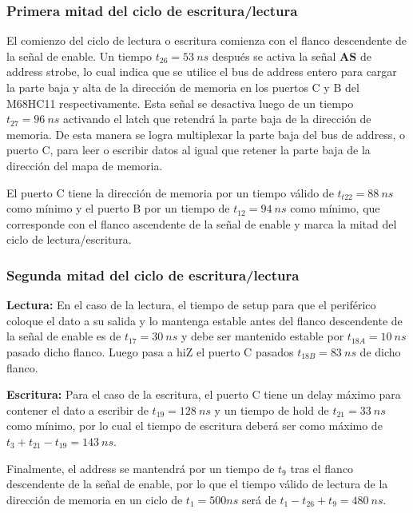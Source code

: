 \subsubsection{Primera mitad del ciclo de escritura/lectura}

El comienzo del ciclo de lectura o escritura comienza con el flanco descendente de la señal de enable. Un tiempo $t_{26} = 53 \ ns$ después se activa la señal \textbf{AS} de address strobe, lo cual indica que se utilice el bus de address entero para cargar la parte baja y alta de la dirección de memoria en los puertos C y B del M68HC11 respectivamente. Esta señal se desactiva luego de un tiempo $t_{27} = 96 \ ns$ activando el latch que retendrá la parte baja de la dirección de memoria. De esta manera se logra multiplexar la parte baja del bus de address, o puerto C, para leer o escribir datos al igual que retener la parte baja de la dirección del mapa de memoria.

El puerto C tiene la dirección de memoria por un tiempo válido de $t_{t22} = 88 \ ns$ como mínimo y el puerto B por un tiempo de $t_{12} = 94 \ ns$ como mínimo, que corresponde con el flanco ascendente de la señal de enable y marca la mitad del ciclo de lectura/escritura.

\subsubsection{Segunda mitad del ciclo de escritura/lectura} 
\textbf{Lectura:}
En el caso de la lectura, el tiempo de setup para que el periférico coloque el dato a su salida y lo mantenga estable antes del flanco descendente de la señal de enable es de $t_{17} = 30 \ ns$ y debe ser mantenido estable por $t_{18A} = 10 \ ns$ pasado dicho flanco. Luego pasa a hiZ el puerto C pasados $t_{18B} = 83 \ ns$ de dicho flanco.

\textbf{Escritura:}
Para el caso de la escritura, el puerto C tiene un delay máximo para contener el dato a escribir de $t_{19} = 128 \ ns$ y un tiempo de hold de $t_{21} = 33 \ ns$ como mínimo, por lo cual el tiempo de escritura deberá ser como máximo de $t_{3} + t_{21} - t_{19} = 143 \ ns$.

Finalmente, el address se mantendrá por un tiempo de $t_9$ tras el flanco descendente de la señal de enable, por lo que el tiempo válido de lectura de la dirección de memoria en un ciclo de $t_1 = 500ns$ será de $t_1 - t_{26} + t_{9} = 480 \ ns$.
 
 
 
 
 

